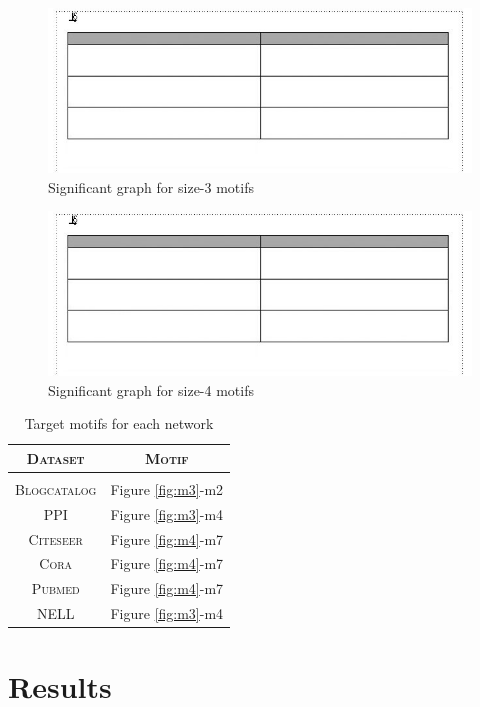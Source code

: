 \documentclass{article}
\theoremstyle{definition}
\begin{document}
\begin{figure} \label{fig:sigm3}
    \centering
    \includegraphics[draft,width=\linewidth]{foo_2col}
    \caption{Significant graph for size-3 motifs}
\end{figure}

\begin{figure} \label{fig:sigm4}
    \centering
    \includegraphics[draft,width=\linewidth]{foo_2col}
    \caption{Significant graph for size-4 motifs}
\end{figure}

\begin{table}
\centering
\begin{tabular}{c c}
\textsc{Dataset} & \textsc{Motif} \\
\hline \\
\textsc{Blogcatalog} & Figure \ref{fig:m3}-m2 \\
\textsc{PPI} & Figure \ref{fig:m3}-m4 \\
\textsc{Citeseer} & Figure \ref{fig:m4}-m7 \\
\textsc{Cora} & Figure \ref{fig:m4}-m7 \\
\textsc{Pubmed} & Figure \ref{fig:m4}-m7 \\
\textsc{NELL} & Figure \ref{fig:m3}-m4 \\
\end{tabular}%
\caption{Target motifs for each network}
\label{t:motifs}
\end{table}

\section{Results}
\end{document}
